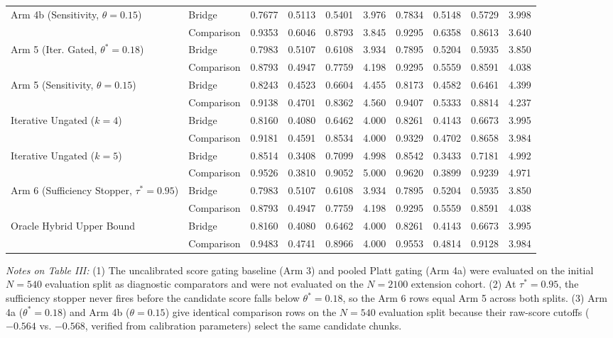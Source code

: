 \documentclass[conference]{IEEEtran}
\begin{document}
\begin{table}[t]
{\begin{tabular}{llcccccccc}
\midrule
\multirow{2}{*}{Arm 4b (Sensitivity, $\theta=0.15$)}
 & Bridge     & 0.7677 & 0.5113 & 0.5401 & 3.976 & 0.7834 & 0.5148 & 0.5729 & 3.998 \\
 & Comparison & 0.9353 & 0.6046 & 0.8793 & 3.845 & 0.9295 & 0.6358 & 0.8613 & 3.640 \\
\midrule
\multirow{2}{*}{Arm 5 (Iter. Gated, $\theta^*=0.18$)}
 & Bridge     & 0.7983 & 0.5107 & 0.6108 & 3.934 & 0.7895 & 0.5204 & 0.5935 & 3.850 \\
 & Comparison & 0.8793 & 0.4947 & 0.7759 & 4.198 & 0.9295 & 0.5559 & 0.8591 & 4.038 \\
\midrule
\multirow{2}{*}{Arm 5 (Sensitivity, $\theta=0.15$)}
 & Bridge     & 0.8243 & 0.4523 & 0.6604 & 4.455 & 0.8173 & 0.4582 & 0.6461 & 4.399 \\
 & Comparison & 0.9138 & 0.4701 & 0.8362 & 4.560 & 0.9407 & 0.5333 & 0.8814 & 4.237 \\
\midrule
\multirow{2}{*}{Iterative Ungated ($k=4$)}
 & Bridge     & 0.8160 & 0.4080 & 0.6462 & 4.000 & 0.8261 & 0.4143 & 0.6673 & 3.995 \\
 & Comparison & 0.9181 & 0.4591 & 0.8534 & 4.000 & 0.9329 & 0.4702 & 0.8658 & 3.984 \\
\midrule
\multirow{2}{*}{Iterative Ungated ($k=5$)}
 & Bridge     & 0.8514 & 0.3408 & 0.7099 & 4.998 & 0.8542 & 0.3433 & 0.7181 & 4.992 \\
 & Comparison & 0.9526 & 0.3810 & 0.9052 & 5.000 & 0.9620 & 0.3899 & 0.9239 & 4.971 \\
\midrule
\multirow{2}{*}{Arm 6 (Sufficiency Stopper, $\tau^*=0.95$)}
 & Bridge     & 0.7983 & 0.5107 & 0.6108 & 3.934 & 0.7895 & 0.5204 & 0.5935 & 3.850 \\
 & Comparison & 0.8793 & 0.4947 & 0.7759 & 4.198 & 0.9295 & 0.5559 & 0.8591 & 4.038 \\
\midrule
\multirow{2}{*}{Oracle Hybrid Upper Bound}
 & Bridge     & 0.8160 & 0.4080 & 0.6462 & 4.000 & 0.8261 & 0.4143 & 0.6673 & 3.995 \\
 & Comparison & 0.9483 & 0.4741 & 0.8966 & 4.000 & 0.9553 & 0.4814 & 0.9128 & 3.984 \\
\bottomrule
\end{tabular}%
}
\vspace{1ex}
\begin{flushleft}
\footnotesize \textit{Notes on Table III:} (1) The uncalibrated score gating baseline (Arm 3) and pooled Platt gating (Arm 4a) were evaluated on the initial $N=540$ evaluation split as diagnostic comparators and were not evaluated on the $N=2100$ extension cohort. (2) At $\tau^*=0.95$, the sufficiency stopper never fires before the candidate score falls below $\theta^*=0.18$, so the Arm 6 rows equal Arm 5 across both splits. (3) Arm 4a ($\theta^*=0.18$) and Arm 4b ($\theta=0.15$) give identical comparison rows on the $N=540$ evaluation split because their raw-score cutoffs ($-0.564$ vs. $-0.568$, verified from calibration parameters) select the same candidate chunks.
\end{flushleft}
\end{table}
\end{document}
